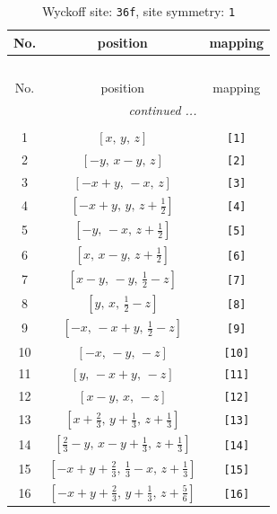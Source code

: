 \documentclass[fleqn,8pt]{jsarticle}
\begin{document}
\renewcommand{\arraystretch}{1.2}
\begin{longtable}{ccc}
\caption{Wyckoff site: {\tt 36f}, site symmetry: {\tt 1}}
 \\
 \hline \hline
No. & position & mapping \\ \hline \endfirsthead

\multicolumn{2}{l}{\tablename\ \thetable{}} \\
 \hline \hline
No. & position & mapping \\ \hline \endhead

 \hline \hline
\multicolumn{2}{r}{\footnotesize\it continued ...} \\ \endfoot

 \hline \hline
\multicolumn{2}{r}{} \\ \endlastfoot

1 & $\left[ x,\, y,\, z \right]$ & {\tt [1]} \\ \hline
2 & $\left[ - y,\, x - y,\, z \right]$ & {\tt [2]} \\ \hline
3 & $\left[ - x + y,\, - x,\, z \right]$ & {\tt [3]} \\ \hline
4 & $\left[ - x + y,\, y,\, z + \frac{1}{2} \right]$ & {\tt [4]} \\ \hline
5 & $\left[ - y,\, - x,\, z + \frac{1}{2} \right]$ & {\tt [5]} \\ \hline
6 & $\left[ x,\, x - y,\, z + \frac{1}{2} \right]$ & {\tt [6]} \\ \hline
7 & $\left[ x - y,\, - y,\, \frac{1}{2} - z \right]$ & {\tt [7]} \\ \hline
8 & $\left[ y,\, x,\, \frac{1}{2} - z \right]$ & {\tt [8]} \\ \hline
9 & $\left[ - x,\, - x + y,\, \frac{1}{2} - z \right]$ & {\tt [9]} \\ \hline
10 & $\left[ - x,\, - y,\, - z \right]$ & {\tt [10]} \\ \hline
11 & $\left[ y,\, - x + y,\, - z \right]$ & {\tt [11]} \\ \hline
12 & $\left[ x - y,\, x,\, - z \right]$ & {\tt [12]} \\ \hline
13 & $\left[ x + \frac{2}{3},\, y + \frac{1}{3},\, z + \frac{1}{3} \right]$ & {\tt [13]} \\ \hline
14 & $\left[ \frac{2}{3} - y,\, x - y + \frac{1}{3},\, z + \frac{1}{3} \right]$ & {\tt [14]} \\ \hline
15 & $\left[ - x + y + \frac{2}{3},\, \frac{1}{3} - x,\, z + \frac{1}{3} \right]$ & {\tt [15]} \\ \hline
16 & $\left[ - x + y + \frac{2}{3},\, y + \frac{1}{3},\, z + \frac{5}{6} \right]$ & {\tt [16]} \\ \hline

\end{longtable}
\end{document}
